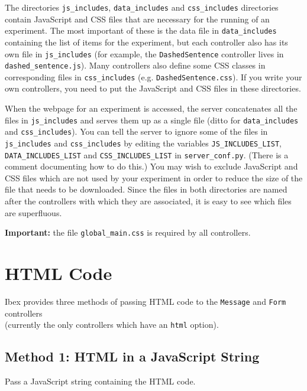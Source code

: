 \documentclass[]{article}
\begin{document}
The directories \texttt{js\_includes}, \texttt{data\_includes} and
\texttt{css\_includes} directories contain JavaScript and CSS files that
are necessary for the running of an experiment. The most important of
these is the data file in \texttt{data\_includes} containing the list of
items for the experiment, but each controller also has its own file in
\texttt{js\_includes} (for example, the \texttt{DashedSentence}
controller lives in \texttt{dashed\_sentence.js}). Many controllers also
define some CSS classes in corresponding files in \texttt{css\_includes}
(e.g. \texttt{DashedSentence.css}). If you write your own controllers,
you need to put the JavaScript and CSS files in these directories.

When the webpage for an experiment is accessed, the server concatenates
all the files in \texttt{js\_includes} and serves them up as a single
file (ditto for \texttt{data\_includes} and \texttt{css\_includes}). You
can tell the server to ignore some of the files in \texttt{js\_includes}
and \texttt{css\_includes} by editing the variables
\texttt{JS\_INCLUDES\_LIST}, \texttt{DATA\_INCLUDES\_LIST} and
\texttt{CSS\_INCLUDES\_LIST} in \texttt{server\_conf.py}. (There is a
comment documenting how to do this.) You may wish to exclude JavaScript
and CSS files which are not used by your experiment in order to reduce
the size of the file that needs to be downloaded. Since the files in
both directories are named after the controllers with which they are
associated, it is easy to see which files are superfluous.

\textbf{Important:} the file \texttt{global\_main.css} is required by
all controllers.

\section{HTML Code}\label{html-code}

Ibex provides three methods of passing HTML code to the \texttt{Message}
and \texttt{Form} controllers\\(currently the only controllers which
have an \texttt{html} option).

\subsection{Method 1: HTML in a JavaScript
String}\label{method-1-html-in-a-javascript-string}

Pass a JavaScript string containing the HTML code.
\end{document}
